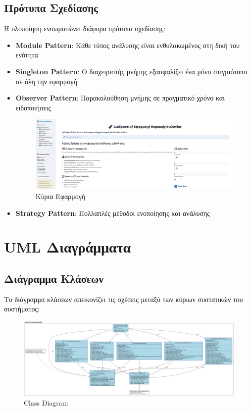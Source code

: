 \documentclass[11pt,a4paper]{article}
\begin{document}
\subsection{Πρότυπα Σχεδίασης}

Η υλοποίηση ενσωματώνει διάφορα πρότυπα σχεδίασης:

\begin{itemize}
    \item \textbf{Module Pattern}: Κάθε τύπος ανάλυσης είναι ενθυλακωμένος στη δική του ενότητα
    \item \textbf{Singleton Pattern}: Ο διαχειριστής μνήμης εξασφαλίζει ένα μόνο στιγμιότυπο σε όλη την εφαρμογή
    \item \textbf{Observer Pattern}: Παρακολούθηση μνήμης σε πραγματικό χρόνο και ειδοποιήσεις
\begin{figure}
        \centering
        \includegraphics[scale=0.5]{main.png}
        \caption{Κύρια Εφαρμογή}
        \label{fig:placeholder}
    \end{figure}
        \item \textbf{Strategy Pattern}: Πολλαπλές μέθοδοι ενοποίησης και ανάλυσης
\end{itemize}




\section{UML Διαγράμματα}

\subsection{Διάγραμμα Κλάσεων}

Το διάγραμμα κλάσεων απεικονίζει τις σχέσεις μεταξύ των κύριων συστατικών του συστήματος:

\begin{figure}
    \centering
    \includegraphics[width=1.0\linewidth]{UML_Class_Diagram.png}
    \caption{Class Diagram}
    \label{fig:placeholder}
\end{figure}
\end{document}
